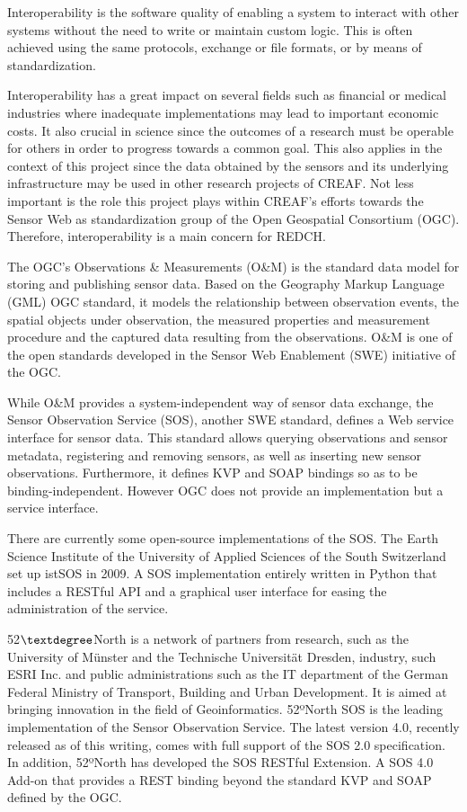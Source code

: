 Interoperability is the software quality of enabling a system to interact with other systems without the need to write or maintain custom logic. This is often achieved using the same protocols, exchange or file formats, or by means of standardization.

Interoperability has a great impact on several fields such as financial or medical industries where inadequate implementations may lead to important economic costs. It also crucial in science since the outcomes of a research must be operable for others in order to progress towards a common goal. This also applies in the context of this project since the data obtained by the sensors and its underlying infrastructure may be used in other research projects of CREAF. Not less important is the role this project plays within CREAF's efforts towards the Sensor Web \cite{SWE} as standardization group of the Open Geospatial Consortium (OGC). Therefore, interoperability is a main concern for REDCH.

The OGC's Observations \& Measurements (O\&M) \cite{OM} is the standard data model for storing and publishing sensor data. Based on the Geography Markup Language (GML) OGC standard, it models the relationship between observation events, the spatial objects under observation, the measured properties and measurement procedure and the captured data resulting from the observations. O\&M is one of the open standards developed in the Sensor Web Enablement (SWE) initiative of the OGC.

While O\&M provides a system-independent way of sensor data exchange, the Sensor Observation Service (SOS), another SWE standard, defines a Web service interface for sensor data. This standard allows querying observations and sensor metadata, registering and removing sensors, as well as inserting new sensor observations. Furthermore, it defines KVP and SOAP bindings so as to be binding-independent. However OGC does not provide an implementation but a service interface.

There are currently some open-source implementations of the SOS. The Earth Science Institute of the University of Applied Sciences of the South Switzerland set up istSOS \cite{istSOS} in 2009. A SOS implementation entirely written in Python that includes a RESTful API and a graphical user interface for easing the administration of the service.

52$\textdegree$North is a network of partners from research, such as the University of Münster and the Technische Universität Dresden, industry, such ESRI Inc. and public administrations such as the IT department of the German Federal Ministry of Transport, Building and Urban Development. It is aimed at bringing innovation in the field of Geoinformatics. 52ºNorth SOS \cite{52north-SOS} is the leading implementation of the Sensor Observation Service. The latest version 4.0, recently released as of this writing, comes with full support of the SOS 2.0 specification. In addition, 52ºNorth has developed the SOS RESTful Extension. A SOS 4.0 Add-on that provides a REST binding beyond the standard KVP and SOAP defined by the OGC.

